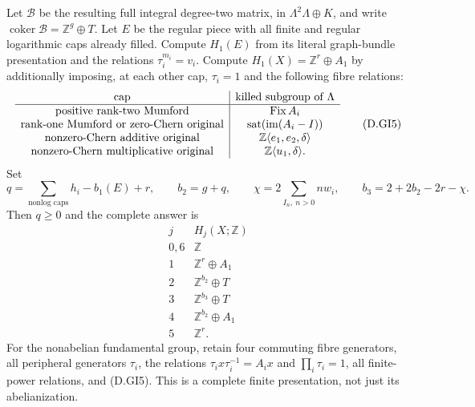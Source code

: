 Let $\mathcal B$ be the resulting full integral degree-two
matrix, in $\Lambda^2\Lambda\oplus K$, and write
$\operatorname{coker}\mathcal B=\mathbb Z^g\oplus T$.
Let $E$ be the regular piece with all finite and regular
logarithmic caps already filled. Compute $H_1(E)$ from its
literal graph-bundle presentation and the relations
$\tau_i^{m_i}=v_i$. Compute $H_1(X)=\mathbb Z^r\oplus A_1$
by additionally imposing, at each other cap, $\tau_i=1$
and the following fibre relations:
\[
\begin{array}{c|c}
\hbox{cap}&\hbox{killed subgroup of }\Lambda\\\hline
\hbox{positive rank-two Mumford}&\operatorname{Fix}A_i\\
\hbox{rank-one Mumford or zero-Chern original}&
                  \operatorname{sat}(\operatorname{im}(A_i-I))\\
\hbox{nonzero-Chern additive original}&
                  \mathbb Z\langle e_1,e_2,\delta\rangle\\
\hbox{nonzero-Chern multiplicative original}&
                  \mathbb Z\langle u_1,\delta\rangle .
\end{array}                                                \tag{D.GI5}
\]
Set
\[
 q=\sum_{\text{nonlog caps}}h_i-b_1(E)+r,\qquad
 b_2=g+q,\qquad
 \chi=2\sum_{I_n,\ n>0}nw_i,\qquad
 b_3=2+2b_2-2r-\chi .                                    \tag{D.GI6}
\]
Then $q\ge0$ and the complete answer is
\[
\begin{array}{c|c}
j&H_j(X;\mathbb Z)\\\hline
0,6&\mathbb Z\\
1&\mathbb Z^r\oplus A_1\\
2&\mathbb Z^{b_2}\oplus T\\
3&\mathbb Z^{b_3}\oplus T\\
4&\mathbb Z^{b_2}\oplus A_1\\
5&\mathbb Z^r .
\end{array}                                                \tag{D.GI7}
\]
For the nonabelian fundamental group, retain four commuting
fibre generators, all peripheral generators $\tau_i$, the
relations $\tau_i x\tau_i^{-1}=A_i x$ and
$\prod_i\tau_i=1$, all finite-power relations, and
(D.GI5). This is a complete finite presentation, not just
its abelianization.

